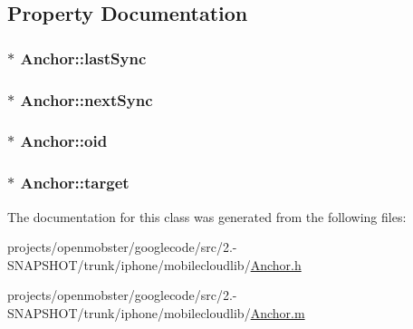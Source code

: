 \subsection{\-Property \-Documentation}
\hypertarget{interface_anchor_a00a078ac73a370cf682b07cd08a8cea6}{
\subsubsection[{last\-Sync}]{$\ast$ \-Anchor\-::last\-Sync}}
\label{interface_anchor_a00a078ac73a370cf682b07cd08a8cea6}
\hypertarget{interface_anchor_ae6ce31caccba0d8974f14e5bea2525fa}{
\subsubsection[{next\-Sync}]{$\ast$ \-Anchor\-::next\-Sync}}
\label{interface_anchor_ae6ce31caccba0d8974f14e5bea2525fa}
\hypertarget{interface_anchor_a0a09df47300a690cff7d8b1df88fd524}{
\subsubsection[{oid}]{$\ast$ \-Anchor\-::oid}}
\label{interface_anchor_a0a09df47300a690cff7d8b1df88fd524}
\hypertarget{interface_anchor_a67abb3f4400fc8ea6748865a40576336}{
\subsubsection[{target}]{$\ast$ \-Anchor\-::target}}
\label{interface_anchor_a67abb3f4400fc8ea6748865a40576336}


\-The documentation for this class was generated from the following files\-:\begin{DoxyCompactItemize}
\item 
projects/openmobster/googlecode/src/2.-\/\-S\-N\-A\-P\-S\-H\-O\-T/trunk/iphone/mobilecloudlib/\hyperlink{_anchor_8h}{\-Anchor.\-h}\item 
projects/openmobster/googlecode/src/2.-\/\-S\-N\-A\-P\-S\-H\-O\-T/trunk/iphone/mobilecloudlib/\hyperlink{_anchor_8m}{\-Anchor.\-m}\end{DoxyCompactItemize}
